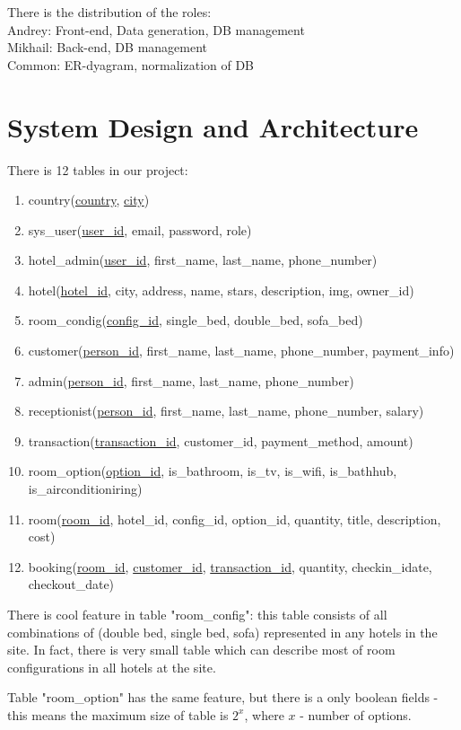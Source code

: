 \documentclass{sig-alternate-05-2015}
\begin{document}
There is the distribution of the roles:\\
Andrey: Front-end, Data generation, DB management\\
Mikhail: Back-end, DB management\\
Common: ER-dyagram, normalization of DB


\section{System Design and Architecture}
There is 12 tables in our project:
\begin{enumerate} 	
\item country(\underline{country}, \underline{city})
\item sys\_user(\underline{user\_id}, email, password, role)
\item hotel\_admin(\underline{user\_id}, first\_name, last\_name, phone\_number)
\item hotel(\underline{hotel\_id}, city, address, name, stars, description, img, owner\_id)
\item room\_condig(\underline{config\_id}, single\_bed, double\_bed, sofa\_bed)
\item customer(\underline{person\_id}, first\_name,  last\_name, phone\_number, payment\_info)
\item admin(\underline{person\_id}, first\_name,  last\_name, phone\_number)
\item receptionist(\underline{person\_id}, first\_name,  last\_name, phone\_number, salary)
\item transaction(\underline{transaction\_id}, customer\_id, payment\_method, amount)
\item room\_option(\underline{option\_id}, is\_bathroom, is\_tv, is\_wifi, is\_bathhub, is\_airconditioniring)
\item room(\underline{room\_id}, hotel\_id, config\_id, option\_id, quantity, title, description, cost)
\item booking(\underline{room\_id}, \underline{customer\_id}, \underline{transaction\_id}, quantity, checkin\_idate, checkout\_date)
\end{enumerate}

There is cool feature in table "room\_config": this table consists of all combinations of (double bed, single bed, sofa) represented in any hotels in the site. In fact, there is very small table which can describe most of room configurations in all hotels at the site. 

Table "room\_option" has the same feature, but there is a only boolean fields - this means the maximum size of table is $ 2^x $, where $x$ - number of options.
\end{document}
